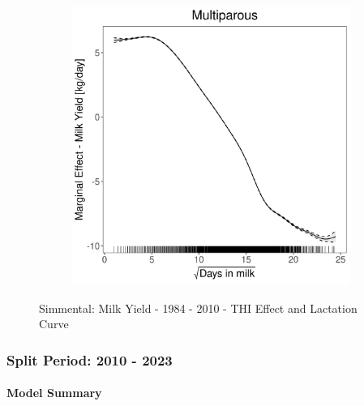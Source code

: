 \begin{figure}[H]
\begin{subfigure}[b]{0.45\textwidth}
    \end{subfigure}
    \hspace{0.05\textwidth} %
    \begin{subfigure}[b]{0.45\textwidth}
        \centering
        \includegraphics[width=\textwidth]{thesis/figures/models/milk/before2010/si_milk_before2010/si_milk_before2010_marginal_dim_milk_multi.png}
    \end{subfigure}
    \caption[]{Simmental: Milk Yield - 1984 - 2010 - THI Effect and Lactation Curve}
    \label{fig:main}
\end{figure}

\subsubsection{Split Period: 2010 - 2023}\label{model:si_milk_after}

\paragraph{Model Summary} \quad \\


